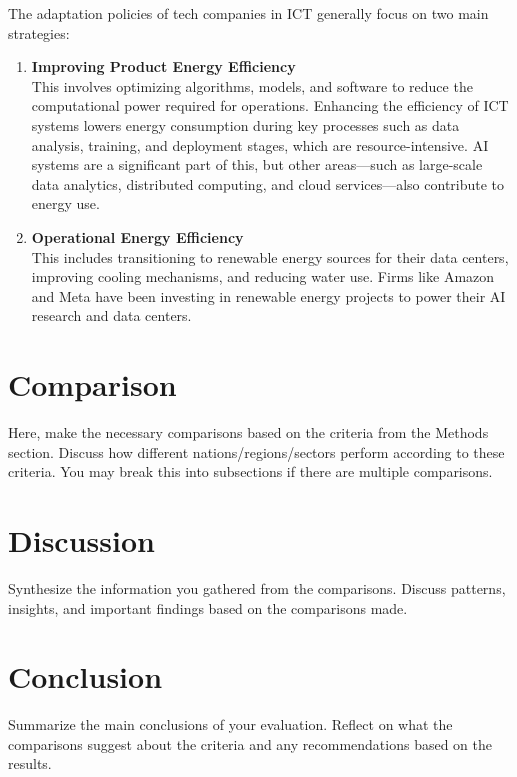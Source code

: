 \documentclass[12pt]{article}
\begin{document}
The adaptation policies of tech companies in ICT generally focus on two main strategies:
\begin{enumerate}
  \item \textbf{Improving Product Energy Efficiency} \\ This involves optimizing algorithms, models, and software to reduce the computational 
  power required for operations. Enhancing the efficiency of ICT systems lowers energy consumption 
  during key processes such as data analysis, training, and deployment stages, which are resource-intensive. AI systems are a significant part 
  of this, but other areas—such as large-scale data analytics, distributed computing, and cloud services—also contribute to energy use.

  
  
  \item \textbf{Operational Energy Efficiency} \\ This includes transitioning to renewable energy sources for their data centers, 
  improving cooling mechanisms, and reducing water use. Firms like Amazon and Meta have been investing in renewable energy projects 
  to power their AI research and data centers.
\end{enumerate}




\section*{Comparison}
Here, make the necessary comparisons based on the criteria from the Methods section. Discuss how different nations/regions/sectors perform according to these criteria. You may break this into subsections if there are multiple comparisons.

\section*{Discussion}
Synthesize the information you gathered from the comparisons. Discuss patterns, insights, and important findings based on the comparisons made.

\section*{Conclusion}
Summarize the main conclusions of your evaluation. Reflect on what the comparisons suggest about the criteria and any recommendations based on the results.

\appendix
\end{document}
